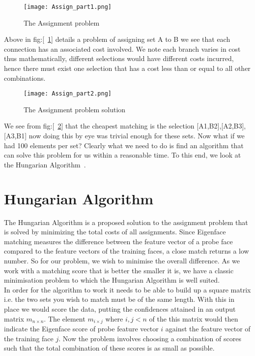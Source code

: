   	\begin{figure}[H]
		\centering
		\caption{The Assignment problem \label{fig:Assign_part1}}
		\texttt{[image: Assign\_part1.png]}
	\end{figure}
	
Above in fig:[~\ref{fig:Assign_part1}] details a problem of assigning set A to B we see that each 
connection has an associated cost involved.  We note each branch varies in cost thus mathematically, 
different selections would have different costs incurred, hence there must exist one selection that 
has a cost less than or equal to all other combinations. 

  	\begin{figure}[H]
		\centering
		\caption{The Assignment problem solution \label{fig:Assign_part2}}
		\texttt{[image: Assign\_part2.png]}
	\end{figure}

We see from fig:[~\ref{fig:Assign_part2}] that the cheapest matching is the selection [A1,B2],[A2,B3],
[A3,B1] now doing this by eye was trivial enough for these sets.  Now what if we had 100 elements per 
set?  Clearly what we need to do is find an algorithm that can solve this problem for us within a 
reasonable time.  To this end, we look at the Hungarian Algorithm~\cite{Hungarian_alg}.
 
\section{Hungarian Algorithm}
The Hungarian Algorithm is a proposed solution to the assignment problem that is solved by minimizing the 
total costs of all assignments.  Since Eigenface matching measures the difference between the feature 
vector of a probe face compared to the feature vectors of the training faces, a close match returns a low 
number.  So for our problem, we wish to minimise the overall difference.  As we work with a matching score that 
is better the smaller it is, we have a classic minimisation problem to which the Hungarian Algorithm is well 
suited. \\

In order for the algorithm to work it needs to be able to build up a square matrix i.e. the two sets you 
wish to match must be of the same length.  With this in place we would score the data, putting the 
confidences attained in an output matrix $m_{n \times n}$.  The element $m_{i \times j}$ where $i,j < n$ 
of the this matrix would then indicate the Eigenface score of probe feature vector $i$ against the feature 
vector of the training face $j$.  Now the problem involves choosing a combination of scores such that the 
total combination of these scores is as small as possible. \\

